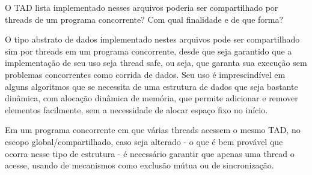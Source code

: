 \question O TAD lista implementado nesses arquivos poderia ser compartilhado por threads
de um programa concorrente? Com qual finalidade e de que forma?
\begin{solution}
    O tipo abstrato de dados implementado nestes arquivos pode ser compartilhado sim por threads em um programa concorrente, desde que seja garantido que a implementação de seu uso seja thread safe, ou seja, que garanta sua execução sem problemas concorrentes como corrida de dados. Seu uso é imprescindível em alguns algoritmos que se necessita de uma estrutura de dados que seja bastante dinâmica, com alocação dinâmica de memória, que permite adicionar e remover elementos facilmente, sem a necessidade de alocar espaço fixo no início.
    
    Em um programa concorrente em que várias threads acessem o mesmo TAD, no escopo global/compartilhado, caso seja alterado - o que é bem provável que ocorra nesse tipo de estrutura - é necessário garantir que apenas uma thread o acesse, usando de mecanismos como exclusão mútua ou de sincronização. 
\end{solution}
